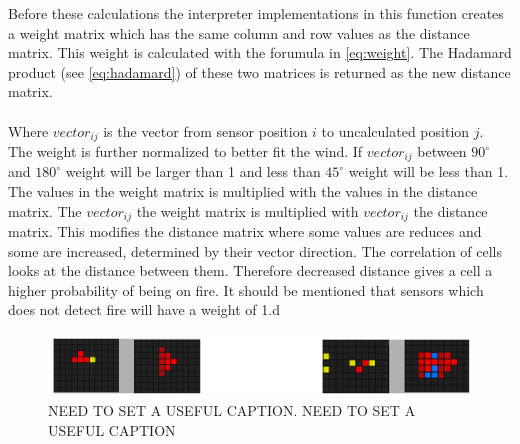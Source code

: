 Before these calculations the interpreter implementations in this function creates a weight matrix which has the same column and row values as the distance matrix. This weight is calculated with the forumula in \ref{eq:weight}. The Hadamard product (see \ref{eq:hadamard}) of these two matrices is returned as the new distance matrix. 
\\\\
Where $ vector_{ij} $ is the vector from sensor position $i$ to uncalculated position $j$. The weight is further normalized to better fit the wind. If $ vector_{ij} $ between $ 90^{\circ} $ and $ 180^{\circ} $ weight will be larger than 1 and less than $ 45^{\circ} $ weight will be less than 1. The values in the weight matrix is multiplied with the values in the distance matrix. The $ vector_{ij} $ the weight matrix is multiplied with $ vector_{ij} $ the distance matrix. This modifies the distance matrix where some values are reduces and some are increased, determined by their vector direction. The correlation of cells looks at the distance between them. Therefore decreased distance gives a cell a higher probability of being on fire. It should be mentioned that sensors which does not detect fire will have a weight of 1.d

\begin{figure}[here]
  \centering
      \includegraphics[width=1.0\textwidth]{solution/graphics/wind-problem.png}
  \caption{NEED TO SET A USEFUL CAPTION. NEED TO SET A USEFUL CAPTION}
  \label{fig:wind-problem}
\end{figure}


